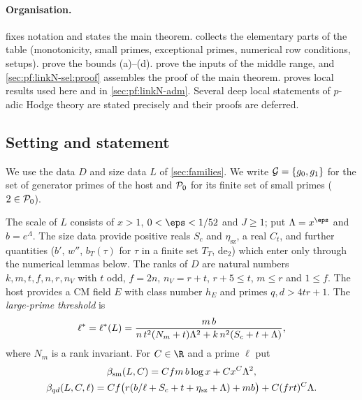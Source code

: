 \paragraph{Organisation.}
 fixes notation and states the main theorem.  collects the elementary
parts of the table (monotonicity, small primes, exceptional primes, numerical row conditions, setups).
 prove the bounds (a)--(d).
 prove the inputs of the middle range, and \cref{sec:pf:linkN-sel:proof}
assembles the proof of the main theorem.  proves local results used here and in \cref{sec:pf:linkN-adm}.
Several deep local statements of $p$-adic Hodge theory are stated precisely and their proofs are deferred.

\subsection{Setting and statement}\label{sec:pf:linkN-sel:setting}

We use the data $D$ and size data $L$ of \cref{sec:families}. We write $\mathcal G=\{g_0,g_1\}$ for the set of generator primes of
the host and $\mathcal P_0$ for its finite set of small primes ($2\in\mathcal P_0$).

\begin{definition}\label{pf:linkN-sel:sizes}
The scale of $L$ consists of $x>1$, $0<\eps<1/52$ and $J\ge1$; put $\Lambda=x^{\eps}$ and $b=e^{\Lambda}$. The size data provide
positive reals $S_c$ and $\eta_{\mathrm{sz}}$, a real $C_t$, and further quantities ($b'$, $w''$, $b_T(\tau)$ for $\tau$ in a
finite set $T_T$, $\mathrm{de}_2$) which enter only through the numerical lemmas below. The ranks of $D$ are natural numbers
$k,m,t,f,n,r,n_V$ with $t$ odd, $f=2n$, $n_V=r+t$, $r+5\le t$, $m\le r$ and $1\le f$. The host provides a CM field $E$ with class
number $h_E$ and primes $q,d>4tr+1$. The \emph{large-prime threshold} is
\[
\ell^{*}=\ell^{*}(L)=\frac{m\,b}{n\,t^2(N_m+t)\Lambda^2+k\,n^2(S_c+t+\Lambda)},
\]
where $N_m$ is a rank invariant. For $C\in\R$ and a prime $\ell$ put
\begin{gather*}
\beta_{\mathrm{sm}}(L,C)=C f m\,b\log x+C x^C\Lambda^2,\\
\beta_{qd}(L,C,\ell)=Cf\bigl(r(b/\ell+S_c+t+\eta_{\mathrm{sz}}+\Lambda)+mb\bigr)+C(frt)^C\Lambda .
\end{gather*}
\end{definition}


